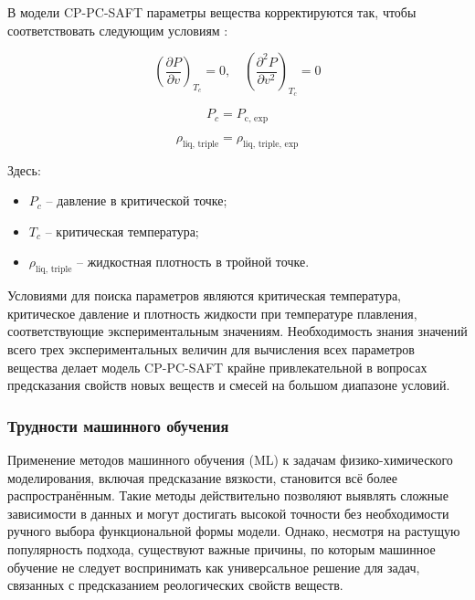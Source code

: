 \documentclass[a4paper,12pt]{article}
\begin{document}
В модели CP-PC-SAFT параметры вещества корректируются так, чтобы соответствовать следующим условиям \cite{polishuk2014standardized}:

\begin{equation}
\left( \frac{\partial P}{\partial v} \right)_{T_c} = 0, \quad
\left( \frac{\partial^2 P}{\partial v^2} \right)_{T_c} = 0
\end{equation}

\begin{equation}
P_c = P_{\text{c, exp}}
\end{equation}

\begin{equation}
\rho_{\text{liq, triple}} = \rho_{\text{liq, triple, exp}}
\end{equation}

Здесь:
\begin{itemize}
    \item \( P_c \) -- давление в критической точке;
    \item \( T_c \) -- критическая температура;
    \item \( \rho_{\text{liq, triple}} \) -- жидкостная плотность в тройной точке.
\end{itemize}

Условиями для поиска параметров являются критическая температура, критическое давление и плотность жидкости при температуре плавления, соответствующие экспериментальным значениям. Необходимость знания значений всего трех экспериментальных величин для вычисления всех параметров вещества делает модель CP-PC-SAFT крайне привлекательной в вопросах предсказания свойств новых веществ и смесей на большом диапазоне условий. 

    \subsubsection{Трудности машинного обучения}

      Применение методов машинного обучения (ML) к задачам физико-химического моделирования, включая предсказание вязкости, становится всё более распространённым. Такие методы действительно позволяют выявлять сложные зависимости в данных и могут достигать высокой точности без необходимости ручного выбора функциональной формы модели. Однако, несмотря на растущую популярность подхода, существуют важные причины, по которым машинное обучение не следует воспринимать как универсальное решение для задач, связанных с предсказанием реологических свойств веществ.
\end{document}
